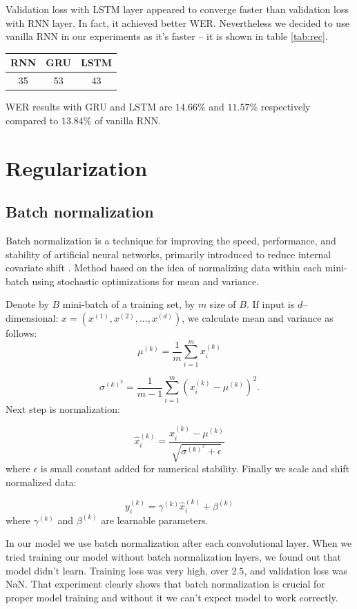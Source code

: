 \documentclass[licencjacka,en]{pracamgr}
\begin{document}
	Validation loss with LSTM layer appeared to converge faster than validation loss with RNN layer. In fact, it achieved better WER. Nevertheless we decided to use vanilla RNN in our experiments as it's faster -- it is shown in table \ref{tab:rec}.
	
	{
		\centering
		\begin{tabular}{|c|c|c|}
			\hline
			RNN & GRU & LSTM \\
			\hline
			\hline
			35 & 53 & 43 \\
			\hline
		\end{tabular}
		\label{tab:rec}
	}
	
	WER results with GRU and LSTM are $14.66$\% and $11.57$\% respectively compared to $13.84$\% of vanilla RNN.
	

	\section{Regularization}
	\subsection{Batch normalization}
	Batch normalization is a technique for improving the speed, performance, and stability of artificial neural networks, primarily introduced to reduce internal covariate shift \cite{BN}. Method based on the idea of normalizing data within each mini-batch using stochastic optimizations for mean and variance.
	
	Denote by $B$ mini-batch of a training set, by $m$ size of $B$. If input is $d$--dimensional: $x = (x^{(1)}, x^{(2)}, \ldots, x^{(d)})$, we calculate mean and variance as follows:
	$$\mu^{(k)} = \frac{1}{m}\sum_{i=1}^m x^{(k)}_i$$
	
	$$ \sigma^{{(k)}^2} = \frac{1}{m-1} \sum_{i = 1}^{m} \left(x^{(k)}_i - \mu^{(k)}\right) ^ 2.$$
	Next step is normalization:
	
	$$
	\hat{x} ^ {(k)} _ i = \frac{x^{(k)}_i - \mu^{(k)}} {\sqrt{ \sigma^{{(k)}^2} + \epsilon}}
	$$
	where $\epsilon$ is small constant added for numerical stability. Finally we scale and shift normalized data:
	
	$$ y^{(k)}_i = \gamma^{(k)} \hat{x}^{(k)}_i + \beta^{(k)}$$
	where $\gamma^{(k)}$ and $\beta^{(k)}$ are learnable parameters.
	
	In our model we use batch normalization after each convolutional layer. When we tried training our model without batch normalization layers, we found out that model didn't learn. Training loss was very high, over $2.5$, and validation loss was NaN. That experiment clearly shows that batch normalization is crucial for proper model training and without it we can't expect model to work correctly.
	
\end{document}
